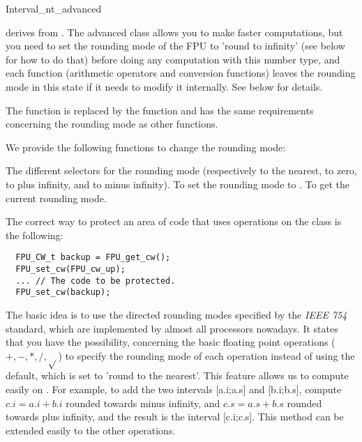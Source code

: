 \begin{ccAdvanced}
\samepage
\begin{ccClass} {Interval_nt_advanced}
\label{interval-adv}

 derives from .
The advanced class allows you to make faster computations, but you need to set
the rounding mode of the FPU to 'round to infinity' (see below for how to do
that) before doing any computation with this number type, and each function
(arithmetic operators and conversion functions)
leaves the rounding mode in this state if it needs to modify it internally.
See below for details.


The function  is replaced by the
function  and has the same
requirements concerning the rounding mode as other functions.



We provide the following functions to change the rounding mode:

       {The different selectors for the rounding mode (respectively to the
       nearest, to zero, to plus infinity, and to minus infinity).}
       {To set the rounding mode to .}
       {To get the current rounding mode.}

\ccExample

The correct way to protect an area of code that uses operations on the class
 is the following:

\begin{verbatim}
  FPU_CW_t backup = FPU_get_cw();
  FPU_set_cw(FPU_cw_up);
  ... // The code to be protected.
  FPU_set_cw(backup);
\end{verbatim}

\ccImplementation

The basic idea is to use the directed rounding modes specified by the 
{\it IEEE 754} standard, which are implemented by almost all processors 
nowadays.
It states that you have the possibility, concerning the basic floating point
operations ($+,-,*,/,\sqrt{}$) to specify the rounding mode of each operation
instead of using the default, which is set to 'round to the nearest'.
This feature allows us to compute easily on .  For example, to
add the two intervals [a.i;a.s] and [b.i;b.s], compute $c.i=a.i+b.i$ rounded
towards minus infinity, and $c.s=a.s+b.s$ rounded towards plus infinity, and
the result is the interval [c.i;c.s].  This method can be extended easily to
the other operations.


\end{ccClass}
\end{ccAdvanced}
